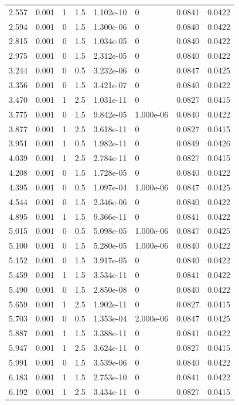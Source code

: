 \documentclass[preview]{standalone}
\begin{document}
{{\begin{tabular}{L{1.2cm}C{1.2cm} C{0.3cm}C{0.5cm} C{1.4cm}C{1.4cm} C{1.4cm}C{1.4cm}}
  2.557  &  0.001  & 1     & 1.5 &  1.102e-10  & 0  & 0.0841 &  0.0422   \\ 
  2.594  &  0.001  & 0     & 1.5 &  1.300e-06  & 0  & 0.0840 &  0.0422   \\ 
  2.815  &  0.001  & 0     & 1.5 &  1.034e-05  & 0  & 0.0840 &  0.0422   \\ 
  2.975  &  0.001  & 0     & 1.5 &  2.312e-05  & 0  & 0.0840 &  0.0422   \\ 
  3.244  &  0.001  & 0     & 0.5 &  3.232e-06  & 0  & 0.0847 &  0.0425   \\ 
  3.356  &  0.001  & 0     & 1.5 &  3.421e-07  & 0  & 0.0840 &  0.0422   \\ 
  3.470  &  0.001  & 1     & 2.5 &  1.031e-11  & 0  & 0.0827 &  0.0415   \\ 
  3.775  &  0.001  & 0     & 1.5 &  9.842e-05  & 1.000e-06  & 0.0840 &  0.0422   \\ 
  3.877  &  0.001  & 1     & 2.5 &  3.618e-11  & 0  & 0.0827 &  0.0415   \\ 
  3.951  &  0.001  & 1     & 0.5 &  1.982e-11  & 0  & 0.0849 &  0.0426   \\ 
  4.039  &  0.001  & 1     & 2.5 &  2.784e-11  & 0  & 0.0827 &  0.0415   \\ 
  4.208  &  0.001  & 0     & 1.5 &  1.728e-05  & 0  & 0.0840 &  0.0422   \\ 
  4.395  &  0.001  & 0     & 0.5 &  1.097e-04  & 1.000e-06  & 0.0847 &  0.0425   \\ 
  4.544  &  0.001  & 0     & 1.5 &  2.346e-06  & 0  & 0.0840 &  0.0422   \\ 
  4.895  &  0.001  & 1     & 1.5 &  9.366e-11  & 0  & 0.0841 &  0.0422   \\ 
  5.015  &  0.001  & 0     & 0.5 &  5.098e-05  & 1.000e-06  & 0.0847 &  0.0425   \\ 
  5.100  &  0.001  & 0     & 1.5 &  5.280e-05  & 1.000e-06  & 0.0840 &  0.0422   \\ 
  5.152  &  0.001  & 0     & 1.5 &  3.917e-05  & 0  & 0.0840 &  0.0422   \\ 
  5.459  &  0.001  & 1     & 1.5 &  3.534e-11  & 0  & 0.0841 &  0.0422   \\ 
  5.490  &  0.001  & 0     & 1.5 &  2.850e-08  & 0  & 0.0840 &  0.0422   \\ 
  5.659  &  0.001  & 1     & 2.5 &  1.902e-11  & 0  & 0.0827 &  0.0415   \\ 
  5.703  &  0.001  & 0     & 0.5 &  1.353e-04  & 2.000e-06  & 0.0847 &  0.0425   \\ 
  5.887  &  0.001  & 1     & 1.5 &  3.388e-11  & 0  & 0.0841 &  0.0422   \\ 
  5.947  &  0.001  & 1     & 2.5 &  3.624e-11  & 0  & 0.0827 &  0.0415   \\ 
  5.991  &  0.001  & 0     & 1.5 &  3.539e-06  & 0  & 0.0840 &  0.0422   \\ 
  6.183  &  0.001  & 1     & 1.5 &  2.753e-10  & 0  & 0.0841 &  0.0422   \\ 
  6.192  &  0.001  & 1     & 2.5 &  3.434e-11  & 0  & 0.0827 &  0.0415   \\ 
\hline 
\end{tabular} 

}}
\end{document}
